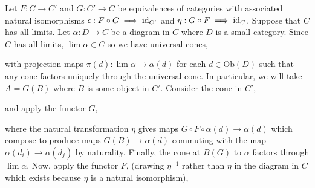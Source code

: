 \documentclass[12pt]{extarticle}
\begin{document}
Let $F : C \to C'$ and $G: C' \to C$ be equivalences of categories with associated natural isomorphisms $\epsilon : F \circ G \implies \mathrm{id}_{C'}$ and $\eta : G \circ F \implies \mathrm{id}_{C}$. Suppose that $C$ has all limits. Let $\alpha : D \to C$ be a diagram in $C$ where $D$ is a small category. Since $C$ has all limits, $\lim{\alpha} \in C$ so we have universal cones,
\begin{center}
\end{center}   
with projection maps $\pi(d) : \lim{\alpha} \to \alpha(d)$ for each $d \in \mathrm{Ob}(D)$ such that any cone factors uniquely through the universal cone. In particular, we will take $A = G(B)$ where $B$ is some object in $C'$. Consider the cone in $C'$,
\begin{center}
\end{center}
and apply the functor $G$,
\begin{center}
\end{center} 
where the natural transformation $\eta$ gives maps $G \circ F \circ \alpha(d) \to \alpha(d)$ which compose to produce maps $G(B) \to \alpha(d)$ commuting with the map $\alpha(d_i) \to \alpha(d_j)$ by naturality. Finally, the cone at $B(G)$ to $\alpha$ factors through $\lim{\alpha}$. Now, apply the functor $F$, (drawing $\eta^{-1}$ rather than $\eta$ in the diagram in $C$ which exists because $\eta$ is a natural isomorphism),
\end{document}
